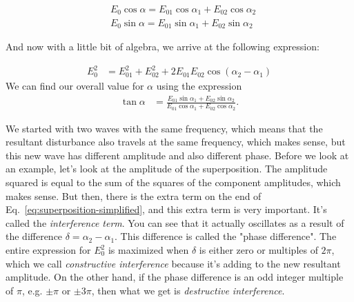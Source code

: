 \begin{equation}
\begin{aligned}
&E_{0} \cos \alpha=E_{01} \cos \alpha_{1}+E_{02} \cos \alpha_{2} \\
&E_{0} \sin \alpha=E_{01} \sin \alpha_{1}+E_{02} \sin \alpha_{2}
\end{aligned}
\end{equation}

And now with a little bit of algebra, we arrive at the following expression:

\begin{equation}
\begin{aligned}
E_{0}^{2} &=E_{01}^{2}+E_{02}^{2}+2 E_{01} E_{02} \cos \left(\alpha_{2}-\alpha_{1}\right)
\end{aligned}
\label{eq:superposition-simplified}
\end{equation}
We can find our overall value for $\alpha$ using the expression
\begin{equation}
\begin{aligned}
\tan \alpha &=\frac{E_{01} \sin \alpha_{1}+E_{02} \sin \alpha_{2}}{E_{01} \cos \alpha_{1}+E_{02} \cos \alpha_{2}}.
\end{aligned}
\label{eq:superposition-simplified}
\end{equation}


We started with two waves with the same frequency, which means that the resultant disturbance also travels at the same frequency, which makes sense, but this new wave has different amplitude and also different phase. Before we look at an example, let's look at the amplitude of the superposition. The amplitude squared is equal to the sum of the squares of the component amplitudes, which makes sense. But then, there is the extra term on the end of Eq.~\ref{eq:superposition-simplified}, and this extra term is very important. It's called the \emph{interference term}. You can see that it actually oscillates as a result of the difference $\delta = \alpha_2 - \alpha_1$. This difference is called the "phase difference". The entire expression for $E_0^2$ is maximized when $\delta$ is either zero or multiples of $2\pi$, which we call \emph{constructive interference} because it's adding to the new resultant amplitude. On the other hand, if the phase difference is an odd integer multiple of $\pi$, e.g. $\pm\pi$ or $\pm 3\pi$, then what we get is \emph{destructive interference}.

